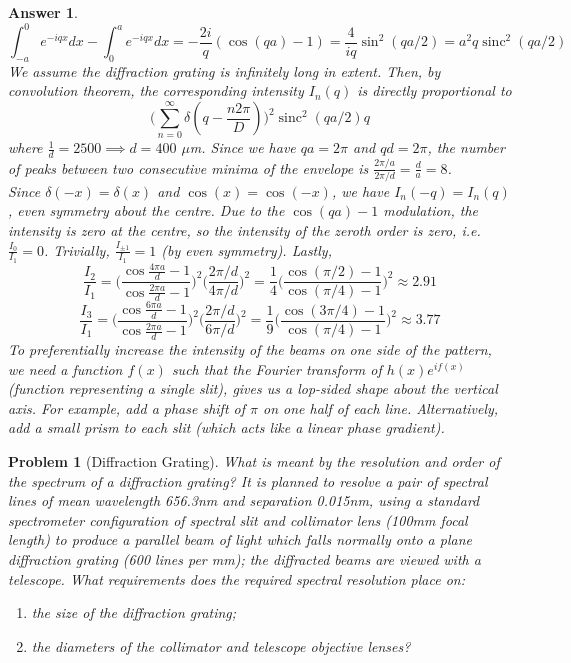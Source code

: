 \documentclass[a4paper]{article}
\DeclareMathOperator{\sinc}{sinc}
\newtheorem{ans}{Answer}[section]
\theoremstyle{new}
\newtheorem{qns}{Problem}[section]
\begin{document}
\begin{ans}
$$\int_{-a}^0e^{-iqx}dx-\int_0^ae^{-iqx}dx=-\frac{2i}{q}(\cos(qa)-1)=\frac{4}{iq}\sin^2(qa/2)=a^2q\sinc^2(qa/2)$$
We assume the diffraction grating is infinitely long in extent. Then, by convolution theorem, the corresponding intensity $I_n(q)$ is directly proportional to
$$\bigg(\sum_{n=0}^\infty\delta(q-\frac{n2\pi}{D})\bigg)^2\sinc^2(qa/2)q$$
where $\frac{1}{d}=2500\implies d=400$ $\mu$m. Since we have $qa=2\pi$ and $qd=2\pi$, the number of peaks between two consecutive minima of the envelope is $\frac{2\pi/a}{2\pi/d}=\frac{d}{a}=8$.\\[5pt]
Since $\delta(-x)=\delta(x)$ and $\cos(x)=\cos(-x)$, we have $I_n(-q)=I_n(q)$, even symmetry about the centre. Due to the $\cos(qa)-1$ modulation, the intensity is zero at the centre, so the intensity of the zeroth order is zero, i.e. $\frac{I_0}{I_1}=0$. Trivially, $\frac{I_{\pm1}}{I_1}=1$ (by even symmetry). Lastly,
$$\frac{I_2}{I_1}=\bigg(\frac{\cos\frac{4\pi a}{d}-1}{\cos\frac{2\pi a}{d}-1}\bigg)^2\bigg(\frac{2\pi/d}{4\pi/d}\bigg)^2=\frac{1}{4}\bigg(\frac{\cos(\pi/2)-1}{\cos(\pi/4)-1}\bigg)^2\approx 2.91$$
$$\frac{I_3}{I_1}=\bigg(\frac{\cos\frac{6\pi a}{d}-1}{\cos\frac{2\pi a}{d}-1}\bigg)^2\bigg(\frac{2\pi/d}{6\pi/d}\bigg)^2=\frac{1}{9}\bigg(\frac{\cos(3\pi/4)-1}{\cos(\pi/4)-1}\bigg)^2\approx 3.77$$
To preferentially increase the intensity of the beams on one side of the pattern, we need a function $f(x)$ such that the Fourier transform of $h(x)e^{if(x)}$ (function representing a single slit), gives us a lop-sided shape about the vertical axis. For example, add a phase shift of $\pi$ on one half of each line. Alternatively, add a small prism to each slit (which acts like a linear phase gradient).
\end{ans}
\begin{qns}[Diffraction Grating]
What is meant by the resolution and order of the spectrum of a diffraction grating? It is
planned to resolve a pair of spectral lines of mean wavelength 656.3nm and separation 0.015nm, using a standard spectrometer configuration of spectral slit and collimator lens (100mm focal length) to produce a parallel beam of light which falls normally onto a plane diffraction grating (600 lines per mm); the diffracted beams are viewed with a telescope. What requirements does the required spectral resolution place on:
\begin{enumerate}[label=(\alph*)]
\item the size of the diffraction grating;
\item the diameters of the collimator and telescope objective lenses?
\end{enumerate}
\end{qns}
\end{document}
